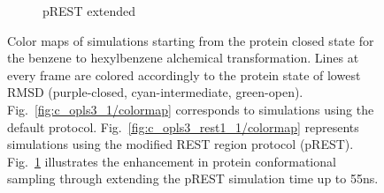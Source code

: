 \documentclass[journal=jctcce,manuscript=article]{achemso}
\begin{document}
\begin{figure}[!ht]
\begin{subfigure}{.5\textwidth}
\end{subfigure}\hfill
\centering
\begin{subfigure}{\textwidth}
   \centering
   \caption{pREST extended}
   \label{fig:c_opls3_rest1_1/cmap-45-55ns}
\end{subfigure}\hfill
\caption{Color maps of simulations starting from the protein closed state for the benzene to hexylbenzene alchemical transformation. 
Lines at every frame are colored accordingly to the protein state of lowest RMSD (purple-closed, cyan-intermediate, green-open). 
Fig.~\ref{fig:c_opls3_1/colormap} corresponds to simulations using the default protocol. Fig.~\ref{fig:c_opls3_rest1_1/colormap} represents simulations using the modified REST region protocol (pREST). Fig.~\ref{fig:c_opls3_rest1_1/cmap-45-55ns} illustrates the enhancement in protein conformational sampling through extending the pREST simulation time up to 55ns. 
}
\label{fig:benzene_to_n-hexyl_colormap}
\end{figure}
\end{document}
